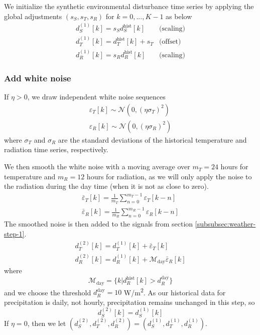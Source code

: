 \documentclass[pdflatex,sn-mathphys-num]{sn-jnl}
\newcommand{\df}[2]{\displaystyle\frac{#1}{#2}}
\begin{document}
We initialize the synthetic environmental disturbance time series by applying the global adjustments $(s_{S}, s_{T}, s_{R})$ for $k=0,...,K-1$ as below
\begin{equation}
\begin{array}{ll}
d_{S}^{(1)}[k] = s_{S}d_{S}^{\text{hist}}[k]    & \text{(scaling)} \\[7pt]
d_{T}^{(1)}[k] = d_{T}^{\text{hist}}[k] + s_{T} & \text{(offset)}  \\[7pt]
d_{R}^{(1)}[k] = s_{R}d_{R}^{\text{hist}}[k]    & \text{(scaling)}
\end{array}
\label{eqn:global-scaling}
\end{equation}

\subsubsection{Add white noise}\label{subsubsec:weather-step-2}

If $\eta > 0$, we draw independent white noise sequences
\begin{align}
\varepsilon_{T}[k] \sim \mathcal{N}(0, (\eta\sigma_{T})^{2}) \\
\varepsilon_{R}[k] \sim \mathcal{N}(0, (\eta\sigma_{R})^{2})
\label{eqn:varepsilon}
\end{align}
where $\sigma_{T}$ and $\sigma_{R}$ are the standard deviations of the historical temperature and radiation time series, respectively.

We then smooth the white noise with a moving average over $m_{T} = 24$ hours for temperature and $m_{R} = 12$ hours for radiation, as we will only apply the noise to the radiation during the day time (when it is not as close to zero).
\begin{align}
\bar{\varepsilon}_{T}[k] = \df{1}{m_{T}} \sum_{n=0}^{m_{T} - 1} \varepsilon_{T}[k-n] \\
\bar{\varepsilon}_{R}[k] = \df{1}{m_{R}} \sum_{n=0}^{m_{R} - 1} \varepsilon_{R}[k-n]
\label{eqn:smooth-noise}
\end{align}
The smoothed noise is then added to the signals from section \ref{subsubsec:weather-step-1}.
\begin{align}
d_{T}^{(2)}[k] = d_{T}^{(1)}[k] + \bar{\varepsilon}_{T}[k] \\
d_{R}^{(2)}[k] = d_{R}^{(1)}[k] + \mathcal{M}_{\text{day}}\bar{\varepsilon}_{R}[k]
\label{eqn:add-noise}
\end{align}
where
\begin{equation}
\mathcal{M}_{\text{day}} = \{ k | d_{R}^{\text{hist}}[k] > d_{R}^{\text{day}} \}
\label{eqn:daymask}
\end{equation}
and we choose the threshold $d_{R}^{\text{day}} = 10$ W/m\textsuperscript{2}. As our historical data for precipitation is daily, not hourly, precipitation remains unchanged in this step, so
\begin{equation}
d_{S}^{(2)}[k] = d_{S}^{(1)}[k]
\label{eqn:P2-P1}
\end{equation}
If $\eta = 0$, then we let $(d_{S}^{(2)}, d_{T}^{(2)}, d_{R}^{(2)}) = (d_{S}^{(1)}, d_{T}^{(1)}, d_{R}^{(1)})$.
\end{document}
